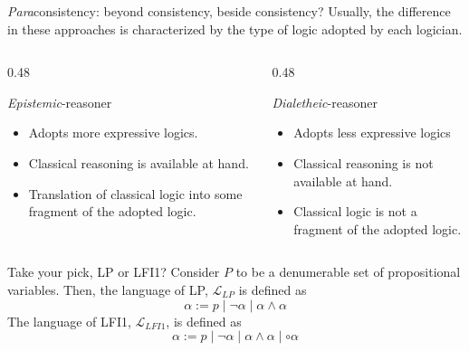 \documentclass[aspectratio=169,11pt]{beamer}
\begin{document}
\begin{frame}{\textit{Para}consistency: beyond consistency, beside consistency?}
   \small Usually, the difference in these approaches is characterized by the type of logic adopted by each logician. 
    \begin{columns}
    \begin{column}{0.48\textwidth}
        \begin{block}{\textit{Epistemic}-reasoner}
        \begin{itemize}
           \item Adopts more expressive logics.
           \item Classical reasoning is available at hand.
           \item Translation of classical logic into some fragment of the adopted logic.
        \end{itemize}
        \end{block}
    \end{column}

    \begin{column}{0.48\textwidth}
        \begin{block}{\textit{Dialetheic}-reasoner}
\begin{itemize}
\item Adopts less expressive logics
\item Classical reasoning is not available at hand.
\item Classical logic is not a fragment of the adopted logic.
\end{itemize}
        \end{block}
    \end{column}

\end{columns}
\end{frame}

\begin{frame}{Take your pick, LP or LFI1?}
Consider $P$ to be a denumerable set of propositional variables. Then, the language of LP, $\mathcal{L}_{LP}$ is defined as
    \[\alpha := p \mid \neg\alpha \mid \alpha \land \alpha \]
The language of LFI1, $\mathcal{L}_{LFI1}$, is defined as 
\[\alpha := p \mid \neg\alpha \mid \alpha \land \alpha \mid \circ\alpha\]
\end{frame}
\end{document}
